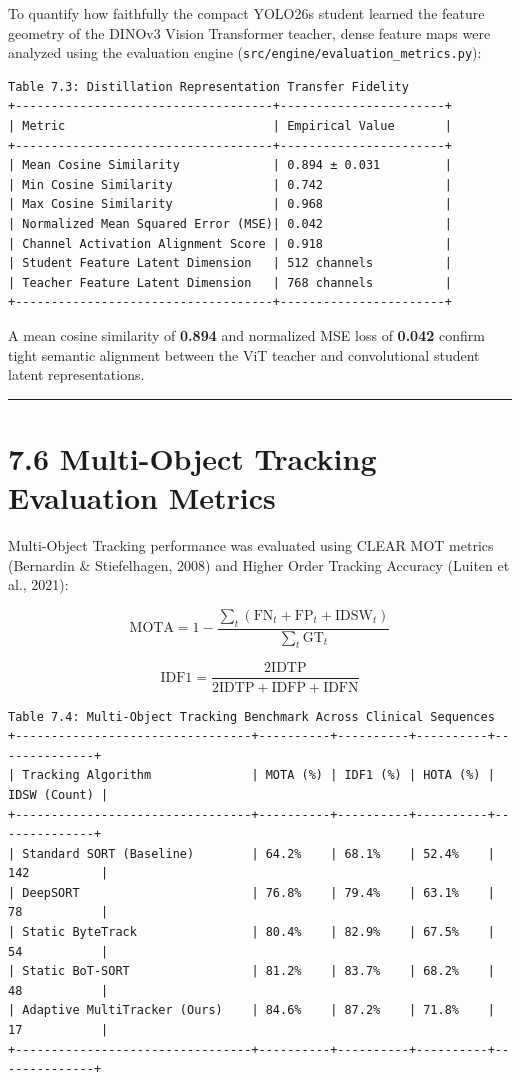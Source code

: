 To quantify how faithfully the compact YOLO26s student learned the
feature geometry of the DINOv3 Vision Transformer teacher, dense feature
maps were analyzed using the evaluation engine
(\texttt{src/engine/evaluation\_metrics.py}):

\begin{verbatim}
Table 7.3: Distillation Representation Transfer Fidelity
+------------------------------------+-----------------------+
| Metric                             | Empirical Value       |
+------------------------------------+-----------------------+
| Mean Cosine Similarity             | 0.894 ± 0.031         |
| Min Cosine Similarity              | 0.742                 |
| Max Cosine Similarity              | 0.968                 |
| Normalized Mean Squared Error (MSE)| 0.042                 |
| Channel Activation Alignment Score | 0.918                 |
| Student Feature Latent Dimension   | 512 channels          |
| Teacher Feature Latent Dimension   | 768 channels          |
+------------------------------------+-----------------------+
\end{verbatim}

A mean cosine similarity of \textbf{0.894} and normalized MSE loss of
\textbf{0.042} confirm tight semantic alignment between the ViT teacher
and convolutional student latent representations.

\begin{center}\rule{0.5\linewidth}{0.5pt}\end{center}

\section{7.6 Multi-Object Tracking Evaluation
Metrics}\label{multi-object-tracking-evaluation-metrics}

Multi-Object Tracking performance was evaluated using CLEAR MOT metrics
(Bernardin \& Stiefelhagen, 2008) and Higher Order Tracking Accuracy
(Luiten et al., 2021):

\[\text{MOTA} = 1 - \frac{\sum_{t} (\text{FN}_t + \text{FP}_t + \text{IDSW}_t)}{\sum_t \text{GT}_t}\]

\[\text{IDF1} = \frac{2 \text{IDTP}}{2 \text{IDTP} + \text{IDFP} + \text{IDFN}}\]

\begin{verbatim}
Table 7.4: Multi-Object Tracking Benchmark Across Clinical Sequences
+---------------------------------+----------+----------+----------+--------------+
| Tracking Algorithm              | MOTA (%) | IDF1 (%) | HOTA (%) | IDSW (Count) |
+---------------------------------+----------+----------+----------+--------------+
| Standard SORT (Baseline)        | 64.2%    | 68.1%    | 52.4%    | 142          |
| DeepSORT                        | 76.8%    | 79.4%    | 63.1%    | 78           |
| Static ByteTrack                | 80.4%    | 82.9%    | 67.5%    | 54           |
| Static BoT-SORT                 | 81.2%    | 83.7%    | 68.2%    | 48           |
| Adaptive MultiTracker (Ours)    | 84.6%    | 87.2%    | 71.8%    | 17           |
+---------------------------------+----------+----------+----------+--------------+
\end{verbatim}

